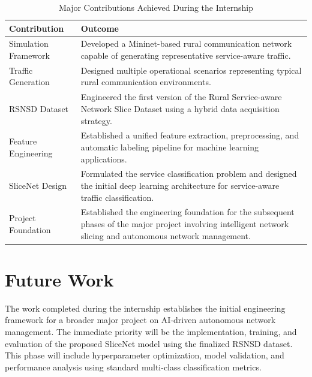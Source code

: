 \documentclass[12pt,a4paper]{report}
\begin{document}
	\begin{table}[H]
		\centering
		\caption{Major Contributions Achieved During the Internship}
		\label{tab:internship_contributions}
		
		\begin{tabular}{|p{5cm}|p{8cm}|}
			\hline
			
			\textbf{Contribution} &
			\textbf{Outcome}
			\\
			\hline
			
			Simulation Framework &
			Developed a Mininet-based rural communication network capable of generating representative service-aware traffic.
			\\
			\hline
			
			Traffic Generation &
			Designed multiple operational scenarios representing typical rural communication environments.
			\\
			\hline
			
			RSNSD Dataset &
			Engineered the first version of the Rural Service-aware Network Slice Dataset using a hybrid data acquisition strategy.
			\\
			\hline
			
			Feature Engineering &
			Established a unified feature extraction, preprocessing, and automatic labeling pipeline for machine learning applications.
			\\
			\hline
			
			SliceNet Design &
			Formulated the service classification problem and designed the initial deep learning architecture for service-aware traffic classification.
			\\
			\hline
			
			Project Foundation &
			Established the engineering foundation for the subsequent phases of the major project involving intelligent network slicing and autonomous network management.
			\\
			\hline
			
		\end{tabular}
		
	\end{table}
	\section{Future Work}
	
	The work completed during the internship establishes the initial engineering framework for a broader major project on AI-driven autonomous network management. The immediate priority will be the implementation, training, and evaluation of the proposed SliceNet model using the finalized RSNSD dataset. This phase will include hyperparameter optimization, model validation, and performance analysis using standard multi-class classification metrics.
	
\end{document}
